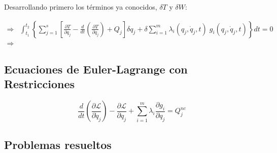\documentclass[/home/hernan/Documentos/Apuntes_mecanica_teorica/main.tex]{subfiles}
\begin{document}
    Desarrollando primero los términos ya conocidos, $\delta T$ y $\delta W$:

    \begin{align*}
        \Rightarrow &  \int_{t_1}^{t_2} \left\{ \sum_{j=1}^{s} \left[ \frac{\partial T}{\partial q_{j}}  - \frac{d}{d t} \left(\frac{\partial T}{\partial \dot{q}_{j}} \right) + Q_{j} \right] \delta q_{j}  + \delta \sum_{i=1}^{m} \lambda_{i}\left(q_{j}, \dot{q}_{j}, t \right) \; g_{i}\left(q_{j}, \dot{q}_{j}, t \right)\right\} dt = 0 \\ 
        \Rightarrow & 
    \end{align*}


    \subsection{Ecuaciones de Euler-Lagrange con Restricciones}
    \begin{definition}
        \begin{equation}
            \frac{d}{d t} \left(\frac{\partial \mathcal{L} }{\partial \dot{q}_{j}} \right) - \frac{\partial \mathcal{L}}{\partial q_{j}} + \sum_{i=1}^{m}\lambda_{i} \frac{\partial g_{i}}{\partial q_{j}}=  Q_{j}^{nc}
        \end{equation}
    \end{definition}


    \subsection{Problemas resueltos}
\end{document}
